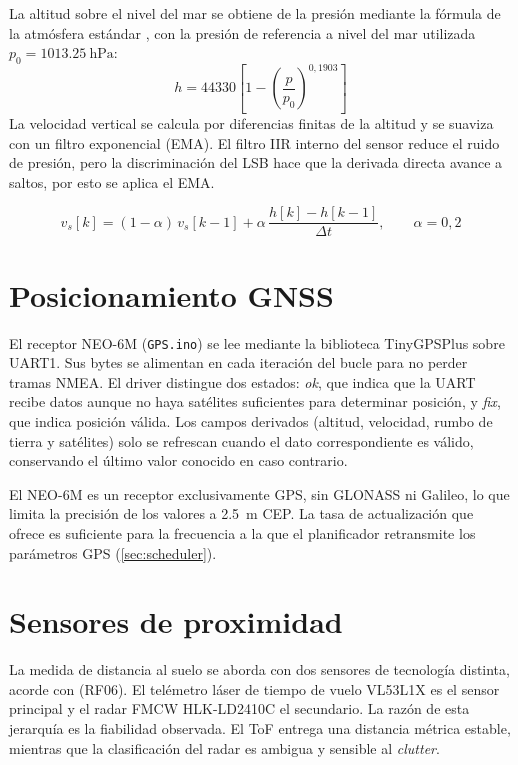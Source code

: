 La altitud sobre el nivel del mar se obtiene de la presión mediante la fórmula
de la atmósfera estándar \cite{icao_isa}, con la presión de referencia a nivel
del mar utilizada $p_0 = \SI{1013.25}{\hecto\pascal}$:
\begin{equation}
    h = 44330\left[1 - \left(\frac{p}{p_0}\right)^{0{,}1903}\right]
\end{equation}
La velocidad vertical se calcula por diferencias finitas de la altitud y
se suaviza con un filtro exponencial (EMA). El filtro IIR interno del sensor reduce el ruido de presión, pero la
discriminación del LSB hace que la derivada directa avance a saltos, por esto se aplica el EMA.

\begin{equation}
    v_s[k] = (1-\alpha)\,v_s[k-1] + \alpha\,\frac{h[k]-h[k-1]}{\Delta t},
    \qquad \alpha = 0{,}2
\end{equation}



\section{Posicionamiento GNSS}
\label{sec:fw_gps}

El receptor NEO-6M (\texttt{GPS.ino}) se lee mediante la biblioteca TinyGPSPlus
sobre UART1. Sus bytes se alimentan en cada iteración del bucle para no perder
tramas NMEA. El driver distingue dos estados: \textit{ok}, que indica que la
UART recibe datos aunque no haya satélites suficientes para determinar posición, y \textit{fix}, que
indica posición válida. Los campos derivados (altitud, velocidad, rumbo de
tierra y satélites) solo se refrescan cuando el dato correspondiente es válido,
conservando el último valor conocido en caso contrario.

El NEO-6M es un receptor exclusivamente GPS, sin GLONASS ni Galileo, lo que limita la precisión de los valores a \SI{2.5}{\meter} CEP. La tasa de actualización que ofrece es suficiente para la frecuencia a la que el
planificador retransmite los parámetros GPS (\cref{sec:scheduler}).


\section{Sensores de proximidad}
\label{sec:fw_proximidad}

La medida de distancia al suelo se aborda con dos sensores de tecnología
distinta, acorde con (RF06). El telémetro láser de tiempo de vuelo VL53L1X es el sensor
principal y el radar FMCW HLK-LD2410C el secundario. La
razón de esta jerarquía es la fiabilidad observada. El ToF entrega una distancia
métrica estable, mientras que la clasificación del radar es ambigua y sensible
al \textit{clutter}.

